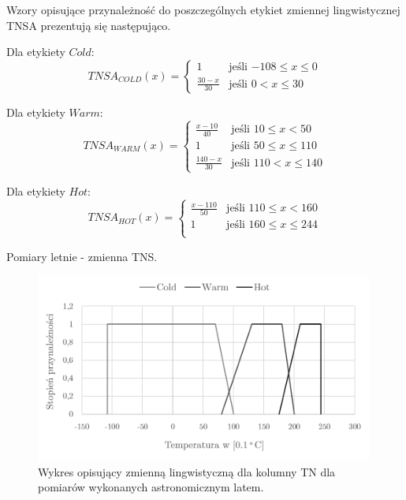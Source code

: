 \documentclass{classrep}
\begin{document}
Wzory opisujące przynależność do poszczególnych etykiet zmiennej lingwistycznej TNSA prezentują się następująco. \newline

Dla etykiety $Cold$:
\begin{equation}
{TNSA}_{COLD}(x)= \left\{ \begin{array}{ll}
1 			& \textrm{jeśli $-108 \leq x \leq 0$} \\
\frac{30-x}{30} 	& \textrm{jeśli $0 < x \leq 30$}
\end{array} \right.
\end{equation}

Dla etykiety $Warm$:
\begin{equation}
{TNSA}_{WARM}(x)= \left\{ \begin{array}{ll}
\frac{x-10}{40} 	 & \textrm{jeśli $10 \leq x < 50$} \\
1 			 & \textrm{jeśli $50 \leq x \leq 110$} \\
\frac{140-x}{30} & \textrm{jeśli $110 < x \leq 140$}
\end{array} \right.
\end{equation}

Dla etykiety $Hot$:
\begin{equation}
{TNSA}_{HOT}(x)= \left\{ \begin{array}{ll}
\frac{x-110}{50} & \textrm{jeśli $110 \leq x < 160$} \\
1 			 & \textrm{jeśli $160 \leq x \leq 244$} \\
\end{array} \right.
\end{equation}\newline

Pomiary letnie - zmienna TNS.
\begin{figure}[H]
	\centering
	\includegraphics[width=0.99\textwidth]{Pictures/TermsCharts/TN_L.png}
	\caption{Wykres opisujący zmienną lingwistyczną dla kolumny TN dla pomiarów wykonanych astronomicznym latem.}
\end{figure}
\end{document}
